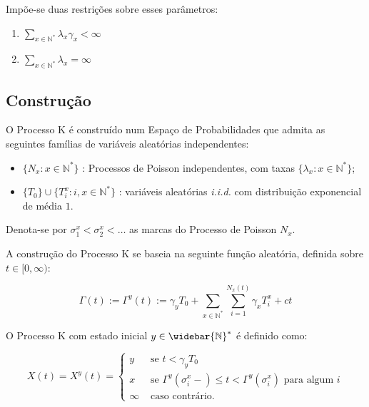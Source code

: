 \documentclass[xcolor=pdftex,dvipsnames]{beamer}
\newcommand{\Nz}{{\mathbb{N^*}}}
\newcommand{\Nzb}{{\mathbb{\widebar{N}^*}}}
\begin{document}
\begin{frame}

  Impõe-se duas restrições sobre esses parâmetros:
  \begin{block}{}
    \begin{enumerate}
    \item $ \displaystyle \sum_{x\in \Nz} \lambda_x \gamma_x <
      \infty $
      \bigskip
    \item $ \displaystyle \sum_{x\in \Nz} \lambda_x = \infty $
    \end{enumerate}
  \end{block}
\end{frame}

\subsection{Construção}

\begin{frame}

  O Processo K é construído num Espaço de Probabilidades que admita as
  seguintes famílias de variáveis aleatórias independentes:

  \begin{itemize}
  \item $\{ N_x: x \in \Nz\}$ : Processos de Poisson independentes,
    com taxas $\{ \lambda_x : x \in \Nz \}$;
  \item $\{T_0\} \cup \{ T_i^x: i, x \in \Nz  \}$ : variáveis aleatórias
    \emph{i.i.d.} com distribuição exponencial de média $1$.
  \end{itemize}

  Denota-se por $\sigma^x_1 < \sigma^x_2 < \ldots$ as marcas do
  Processo de Poisson $N_x$.
  
\end{frame}

\begin{frame}

  A construção do Processo K se baseia na seguinte função aleatória,
  definida sobre $t \in [0, \infty)$:

  \begin{displaymath}
    \Gamma(t) := \Gamma^y(t) :=
    \gamma_y T_0 + \sum_{x \in \Nz} \sum_{i = 1}^{N_x (t)} \gamma_x T^x_i + c t
  \end{displaymath}
\end{frame}

\begin{frame}
  
  O Processo K com estado inicial $y \in \Nzb$ é definido como:

  \begin{displaymath}
    X(t) = X^y (t) =
    \begin{cases}
      y & \textrm{ se }  t < \gamma_y T_0\\
      x & \textrm{ se } \Gamma^y(\sigma_i^x-) \leq t <
      \Gamma^y(\sigma^x_i)
      \textrm{ para algum } i \\
      \infty & \textrm{ caso contrário.}
    \end{cases}
  \end{displaymath}
\end{frame}
\end{document}
